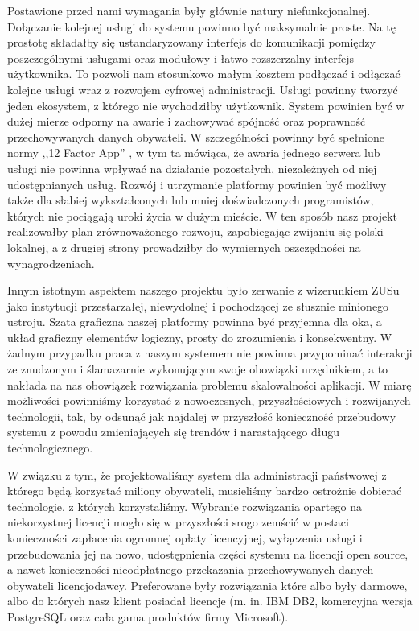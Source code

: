 \documentclass[licencjacka]{pracamgr}
\begin{document}
Postawione przed nami wymagania były głównie natury niefunkcjonalnej. Dołączanie kolejnej usługi do systemu
powinno być maksymalnie proste. Na tę prostotę składałby się ustandaryzowany interfejs do komunikacji pomiędzy
poszczególnymi usługami oraz modułowy i łatwo rozszerzalny interfejs użytkownika.
To pozwoli nam stosunkowo małym kosztem podłączać i odłączać kolejne usługi wraz z
rozwojem cyfrowej administracji. Usługi powinny tworzyć jeden ekosystem, z którego nie wychodziłby użytkownik. System
powinien być w dużej mierze odporny na awarie i zachowywać spójność oraz poprawność przechowywanych danych obywateli.
W szczególności powinny być spełnione normy ,,12 Factor App'' \cite{tfa}, w tym ta mówiąca, że awaria jednego serwera
lub usługi nie powinna wpływać na działanie pozostałych, niezależnych od niej udostępnianych usług.
Rozwój i utrzymanie platformy powinien być możliwy także dla słabiej wykształconych lub mniej doświadczonych
programistów, których nie pociągają uroki życia w dużym mieście. W ten sposób nasz projekt realizowałby plan
zrównoważonego rozwoju, zapobiegając zwijaniu się polski lokalnej, a z drugiej strony prowadziłby do wymiernych
oszczędności na wynagrodzeniach.

Innym istotnym aspektem naszego projektu było zerwanie z wizerunkiem ZUSu jako instytucji przestarzałej, niewydolnej
i pochodzącej ze słusznie minionego ustroju. Szata graficzna naszej platformy powinna być przyjemna dla oka, a układ
graficzny elementów logiczny, prosty do zrozumienia i konsekwentny. W żadnym przypadku praca z naszym systemem nie
powinna przypominać interakcji ze znudzonym i ślamazarnie wykonującym swoje obowiązki urzędnikiem, a to nakłada na
nas obowiązek rozwiązania problemu skalowalności aplikacji. W miarę możliwości
powinniśmy korzystać z nowoczesnych, przyszłościowych i rozwijanych technologii, tak, by odsunąć jak najdalej w
przyszłość konieczność przebudowy systemu z powodu zmieniających się trendów i narastającego długu technologicznego.

W związku z tym, że projektowaliśmy system dla administracji państwowej z którego będą korzystać miliony obywateli,
musieliśmy bardzo ostrożnie dobierać technologie, z których korzystaliśmy. Wybranie rozwiązania opartego na
niekorzystnej licencji mogło się w przyszłości srogo zemścić w postaci konieczności zapłacenia ogromnej opłaty
licencyjnej, wyłączenia usługi i przebudowania jej na nowo, udostępnienia części systemu na licencji open source, a
nawet konieczności nieodpłatnego przekazania przechowywanych danych obywateli licencjodawcy. Preferowane były
rozwiązania które albo były darmowe, albo do których nasz klient posiadał licencje (m. in. IBM DB2, komercyjna wersja PostgreSQL oraz cała gama produktów firmy Microsoft).
\end{document}
